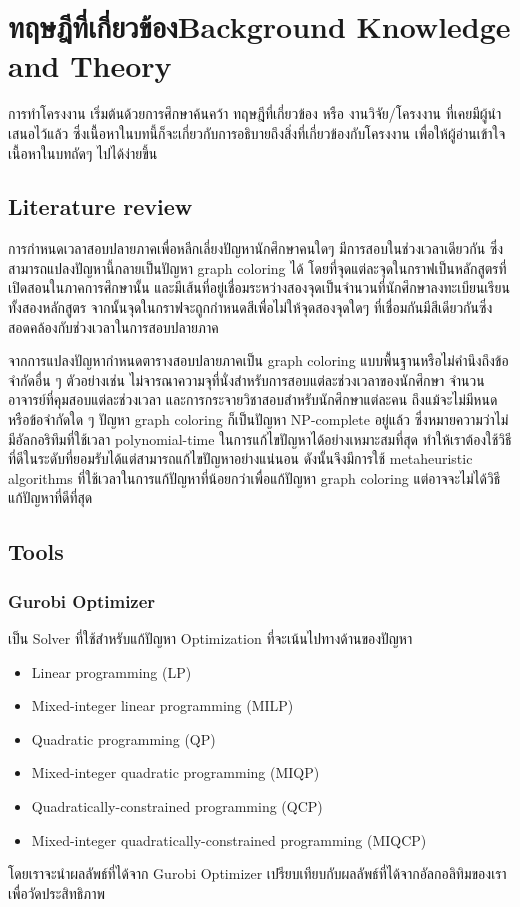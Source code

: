 \chapter{\ifcpe ทฤษฎีที่เกี่ยวข้อง\else Background Knowledge and Theory\fi}
การทำโครงงาน เริ่มต้นด้วยการศึกษาค้นคว้า ทฤษฎีที่เกี่ยวข้อง หรือ งานวิจัย/โครงงาน ที่เคยมีผู้นำเสนอไว้แล้ว ซึ่งเนื้อหาในบทนี้ก็จะเกี่ยวกับการอธิบายถึงสิ่งที่เกี่ยวข้องกับโครงงาน เพื่อให้ผู้อ่านเข้าใจเนื้อหาในบทถัดๆ ไปได้ง่ายขึ้น
\section{Literature review}
การกำหนดเวลาสอบปลายภาคเพื่อหลีกเลี่ยงปัญหานักศึกษาคนใดๆ มีการสอบในช่วงเวลาเดียวกัน ซึ่งสามารถแปลงปัญหานี้กลายเป็นปัญหา graph coloring ได้ 
โดยที่จุดแต่ละจุดในกราฟเป็นหลักสูตรที่เปิดสอนในภาคการศึกษานั้น 
และมีเส้นที่อยู่เชื่อมระหว่างสองจุดเป็นจำนวนที่นักศึกษาลงทะเบียนเรียนทั้งสองหลักสูตร จากนั้นจุดในกราฟจะถูกกำหนดสีเพื่อไม่ให้จุดสองจุดใดๆ 
ที่เชื่อมกันมีสีเดียวกันซึ่งสอดคล้องกับช่วงเวลาในการสอบปลายภาค

จากการแปลงปัญหากำหนดตารางสอบปลายภาคเป็น graph coloring\cite{aia} แบบพื้นฐานหรือไม่คำนึงถึงข้อจำกัดอื่น ๆ 
ตัวอย่างเช่น ไม่จารณาความจุที่นั่งสำหรับการสอบแต่ละช่วงเวลาของนักศึกษา จำนวนอาจารย์ที่คุมสอบแต่ละช่วงเวลา และการกระจายวิชาสอบสำหรับนักศึกษาแต่ละคน 
ถึงแม้จะไม่มีหนดหรือข้อจำกัดใด ๆ ปัญหา graph coloring ก็เป็นปัญหา NP-complete อยู่แล้ว 
ซึ่งหมายความว่าไม่มีอัลกอริทึมที่ใช้เวลา polynomial-time ในการแก้ไขปัญหาได้อย่างเหมาะสมที่สุด 
ทำให้เราต้องใช้วิธีที่ดีในระดับที่ยอมรับได้แต่สามารถแก้ไขปัญหาอย่างแน่นอน ดังนั้นจึงมีการใช้ metaheuristic algorithms ที่ใช้เวลาในการแก้ปัญหาที่น้อยกว่าเพื่อแก้ปัญหา graph coloring แต่อาจจะไม่ได้วิธีแก้ปัญหาที่ดีที่สุด
\section{Tools}
\subsection{Gurobi Optimizer}
  เป็น Solver ที่ใช้สำหรับแก้ปัญหา Optimization ที่จะเน้นไปทางด้านของปัญหา 
\begin{itemize}
  \item Linear programming (LP)
  \item Mixed-integer linear programming (MILP)
  \item Quadratic programming (QP)
  \item Mixed-integer quadratic programming (MIQP)
  \item Quadratically-constrained programming (QCP)
  \item Mixed-integer quadratically-constrained programming (MIQCP)
\end{itemize}
โดยเราจะนำผลลัพธ์ที่ได้จาก Gurobi Optimizer เปรียบเทียบกับผลลัพธ์ที่ได้จากอัลกอลิทิมของเราเพื่อวัดประสิทธิภาพ

